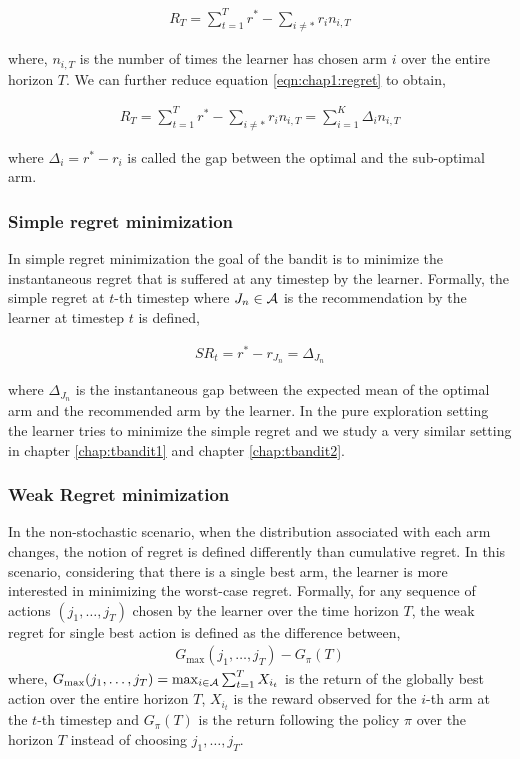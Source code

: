 \begin{eqnarray}
R_{T} = \sum_{t=1}^{T}r^* - \sum_{i\neq *}r_{i}n_{i,T} \label{eqn:chap1:regret}
\end{eqnarray}

where, $n_{i,T}$ is the number of times the learner has chosen arm $i$ over the entire horizon $T$. We can further reduce equation \ref{eqn:chap1:regret} to obtain,

\begin{align*}
R_{T} = \sum_{t=1}^{T}r^* - \sum_{i\neq *}r_{i}n_{i,T} = \sum_{i=1}^{K}\Delta_{i}n_{i,T}
\end{align*}

where $\Delta_{i}=r^* - r_i$ is called the gap between the optimal and the sub-optimal arm.

\subsubsection{Simple regret minimization}
In simple regret minimization the goal of the bandit is to minimize the instantaneous regret that is suffered at any  timestep by the learner. Formally, the simple regret at $t$-th timestep where $J_n\in\mathcal{A}$ is the recommendation by the learner at timestep $t$ is defined,

\begin{align*}
SR_{t} = r^* - r_{J_{n}} = \Delta_{J_n}
\end{align*}

where $\Delta_{J_n}$ is the instantaneous gap between the expected mean of the optimal arm and the recommended arm by the learner. In the pure exploration setting the learner tries to minimize the simple regret and we study a very similar setting in chapter \ref{chap:tbandit1} and chapter \ref{chap:tbandit2}. 

\subsubsection{Weak Regret minimization}
In the non-stochastic scenario, when the distribution associated with each arm changes, the notion of regret is defined differently than cumulative regret. In this scenario, considering that there is a single best arm, the learner is more interested in minimizing the worst-case regret. Formally, for any sequence of actions $\left( j_1, \ldots , j_T \right)$ chosen by the learner over the time horizon $T$, the weak regret for single best action is defined as the difference between,
\begin{align*}
G_{\max}(j_1,\ldots,j_T) - G_{\pi}(T)
\end{align*}
where, $G_{\max}(j_1,\ldots,j_T) = \max_{i\in\mathcal{A}}\sum_{t=1}^{T}X_{i_t}$ is the return of the globally best action over the entire horizon $T$, $X_{i_t}$ is the reward observed for the $i$-th arm at the $t$-th timestep and $G_{\pi}(T)$ is the return following the policy $\pi$ over the horizon $T$ instead of choosing $j_1,\ldots,j_T$.


